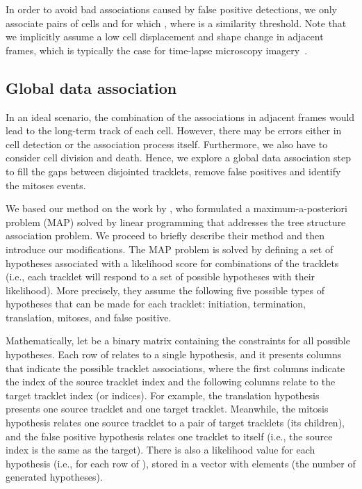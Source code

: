 \documentclass{article}
\begin{document}
In order to avoid bad associations caused by false positive detections, we only associate pairs of cells  and  for which , where  is a similarity threshold. Note that we implicitly assume a low cell displacement and shape change in adjacent frames, which is typically the case for time-lapse microscopy imagery~\cite{bise}. 

\subsection{Global data association}

In an ideal scenario, the combination of the associations in adjacent frames would lead to the long-term track of each cell. However, there may be errors either in cell detection or the association process itself. Furthermore, we also have to consider cell division and death. Hence, we explore a global data association step to fill the gaps between disjointed tracklets, remove false positives and identify the mitoses events. 

We based our method on the work by \cite{bise}, who formulated a maximum-a-posteriori problem (MAP) solved by linear programming that addresses the tree structure association problem. We proceed to briefly describe their method and then introduce our modifications. The MAP problem is solved by defining a set of hypotheses associated with a likelihood score for combinations of the  tracklets (i.e., each tracklet will respond to a set of possible hypotheses with their likelihood). More precisely, they assume the following five possible types of hypotheses that can be made for each tracklet: initiation, termination, translation, mitoses, and false positive. 

Mathematically, let   be a binary matrix containing the constraints for all possible hypotheses. Each row of  relates to a single hypothesis, and it presents  columns that indicate the possible tracklet associations, where the first  columns indicate the index of the source tracklet index and the following  columns relate to the target tracklet index (or indices). For example, the translation hypothesis presents one source tracklet and one target tracklet. Meanwhile, the mitosis hypothesis relates one source tracklet to a pair of target tracklets (its children), and the false positive hypothesis relates one tracklet to itself (i.e., the source index is the same as the target). There is also a likelihood value for each hypothesis (i.e., for each row of ), stored in a vector  with  elements (the number of generated hypotheses).
\end{document}
